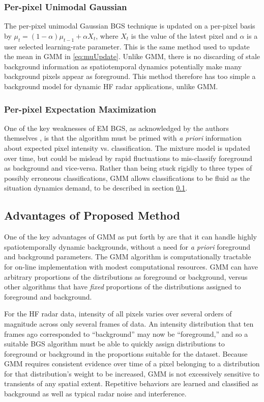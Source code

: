 \FloatBarrier
\subsubsection{Per-pixel Unimodal Gaussian}
The per-pixel unimodal Gaussian BGS technique \citep{pfinder1997} is updated on a per-pixel basis by $\mu_t=(1-\alpha)\mu_{t-1} + \alpha X_t$, where $X_t$ is the value of the latest pixel and $\alpha$ is a user selected learning-rate parameter. This is the same method used to update the mean in GMM in \eqref{eq:muUpdate}. Unlike GMM, there is no discarding of stale background information as spatiotemporal dynamics potentially make many background pixels appear as foreground.
This method therefore has too simple a background model for dynamic HF radar applications, unlike GMM.

\FloatBarrier
\subsubsection{Per-pixel Expectation Maximization}
One of the key weaknesses of EM BGS, as acknowledged by the authors themselves \citep{friedman1997}, is that the algorithm must be primed with \textit{a priori} information about expected pixel intensity vs. classification. 
The mixture model is updated over time, but could be mislead by rapid fluctuations to mis-classify foreground as background and vice-versa.
Rather than being stuck rigidly to three types of possibly erroneous classifications, GMM allows classifications to be fluid as the situation dynamics demand, to be described in section \ref{sec:GMMadv}.

\subsection{Advantages of Proposed Method} \label{sec:GMMadv}
One of the key advantages of GMM as put forth by \citet{stauffer1999} are that it can handle highly spatiotemporally dynamic backgrounds, without a need for \textit{a priori} foreground and background parameters. 
The GMM algorithm is computationally tractable for on-line implementation with modest computational resources.
GMM can have arbitrary proportions of the distributions as foreground or background, versus other algorithms that have \textit{fixed} proportions of the distributions assigned to foreground and background. 

For the HF radar data, intensity of all pixels varies over several orders of magnitude across only several frames of data.
An intensity distribution that ten frames ago corresponded to ``background'' may now be ``foreground,'' and so a suitable BGS algorithm must be able to quickly assign distributions to foreground or background in the proportions suitable for the dataset. 
Because GMM requires consistent evidence over time of a pixel belonging to a distribution for that distribution's weight to be increased, GMM is not excessively sensitive to transients of any spatial extent. 
Repetitive behaviors are learned and classified as background as well as typical radar noise and interference. 

